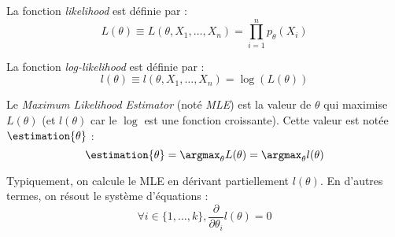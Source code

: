         \begin{definition}
            La fonction \textit{likelihood} est définie par :
            \[
                L(\theta) \equiv L(\theta, X_1, \dots, X_n) = \prod_{i=1}^n p_\theta(X_i)
            \]

            La fonction \textit{log-likelihood} est définie par :
            \[
                l(\theta) \equiv l(\theta, X_1, \dots, X_n) = \log(L(\theta))
            \]

            Le \textit{Maximum Likelihood Estimator} (noté \textit{MLE}) est la valeur de \(\theta\) qui maximise \(L(\theta)\) (et \(l(\theta)\) car le \(\log\) est une fonction croissante). Cette valeur est notée \(\estimation{\theta}\) :
            \[
                \estimation{\theta} = \argmax_\theta L(\theta) = \argmax_\theta l(\theta)
            \]
        \end{definition}

        Typiquement, on calcule le MLE en dérivant partiellement \(l(\theta)\). En d'autres termes, on résout le système d'équations :
        \[
            \forall i \in \{1, \dots, k\}, \frac{\partial}{\partial \theta_i} l(\theta) = 0
        \]